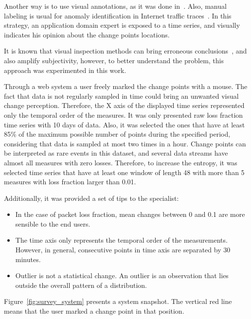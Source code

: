 Another way is to use visual annotations,
as it was done
in~\cite{learning_sparse_penalties_for_change_point_detection_using_max_margin_interval_regression}.
Also, manual labeling is usual for anomaly identification in Internet traffic
traces~\cite{webclass_adding_rigor_to_manual_labeling_of_traffic_anomalies}.
In this strategy, an application domain expert is exposed to a time series,
and visually indicates his opinion about the change points locations.

It is known that visual inspection methods can bring erroneous
conclusions~\cite{leveraging_cloud_data_to_mitigate_user_experience_from_breaking_bad},
and also amplify subjectivity, however, to better understand the problem, this
approach was experimented in this work.

Through a web system a user freely marked the change points with a mouse.
The fact that data is not regularly sampled in time could bring an unwanted
visual change perception. Therefore, the X axis of the displayed time series
represented only the temporal order of the measures.
It was only presented raw
loss fraction time series with 10 days of data.
Also, it was selected the ones that have at
least 85\% of the maximum possible number of points during the specified period,
considering that data is sampled at most two times in a hour. Change points can
be interpreted as rare events in this dataset, and several data streams have
almost
all measures with zero losses. Therefore, to increase the entropy,
it was selected time series that have at least one window of length 48 with
more than 5 measures with loss fraction larger than 0.01.

Additionally, it was provided a set of tips to the specialist:

\begin{itemize}
    \item In the case of packet loss fraction, mean changes between 0 and 0.1
    are more sensible to the end users.
    \item The time axis only represents the temporal order of the measurements.
    However, in general, consecutive points in time axis are separated by 30
    minutes.
    \item Outlier is not a statistical change. An outlier is an observation that
    lies outside the overall pattern of a distribution.
\end{itemize}

Figure~\ref{fig:survey_system} presents a system snapshot.
The vertical red line means that the user marked a change point in that
position.

